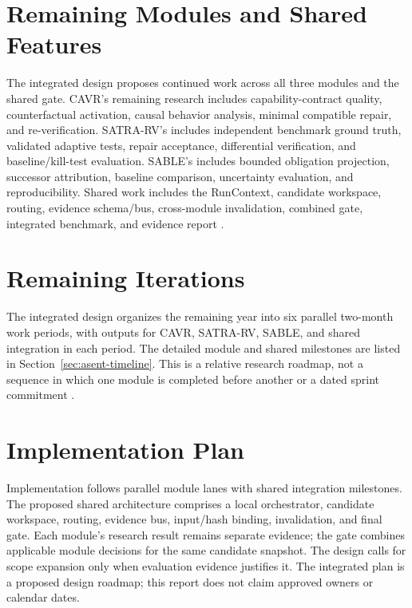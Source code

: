 \section{Remaining Modules and Shared Features}
The integrated design proposes continued work across all three modules and the shared gate. CAVR's remaining research includes capability-contract quality, counterfactual activation, causal behavior analysis, minimal compatible repair, and re-verification. SATRA-RV's includes independent benchmark ground truth, validated adaptive tests, repair acceptance, differential verification, and baseline/kill-test evaluation. SABLE's includes bounded obligation projection, successor attribution, baseline comparison, uncertainty evaluation, and reproducibility. Shared work includes the RunContext, candidate workspace, routing, evidence schema/bus, cross-module invalidation, combined gate, integrated benchmark, and evidence report \cite{asentIntegratedResearchDesign}.

\section{Remaining Iterations}
The integrated design organizes the remaining year into six parallel two-month work periods, with outputs for CAVR, SATRA-RV, SABLE, and shared integration in each period. The detailed module and shared milestones are listed in Section~\ref{sec:asent-timeline}. This is a relative research roadmap, not a sequence in which one module is completed before another or a dated sprint commitment \cite{asentIntegratedResearchDesign}.

\section{Implementation Plan}
Implementation follows parallel module lanes with shared integration milestones. The proposed shared architecture comprises a local orchestrator, candidate workspace, routing, evidence bus, input/hash binding, invalidation, and final gate. Each module's research result remains separate evidence; the gate combines applicable module decisions for the same candidate snapshot. The design calls for scope expansion only when evaluation evidence justifies it. The integrated plan is a proposed design roadmap; this report does not claim approved owners or calendar dates.

